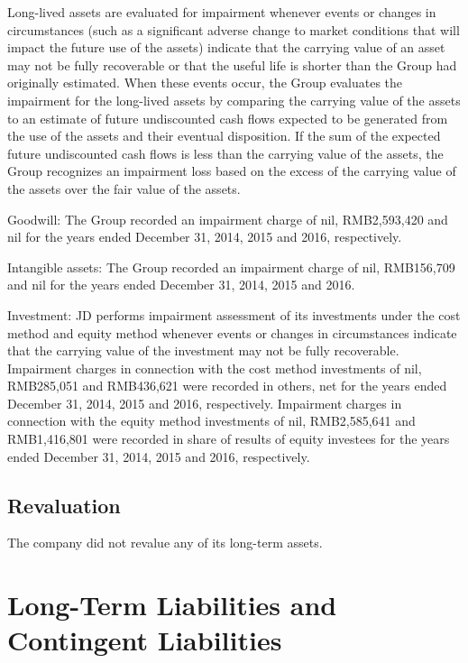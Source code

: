 Long-lived assets are evaluated for impairment whenever events or changes in circumstances (such as a significant adverse change to market conditions that will impact the future use of the assets) indicate that the carrying value of an asset may not be fully recoverable or that the useful life is shorter than the Group had originally estimated. When these events occur, the Group evaluates the impairment for the long-lived assets by comparing the carrying value of the assets to an estimate of future undiscounted cash flows expected to be generated from the use of the assets and their eventual disposition. If the sum of the expected future undiscounted cash flows is less than the carrying value of the assets, the Group recognizes an impairment loss based on the excess of the carrying value of the assets over the fair value of the assets.

Goodwill: The Group recorded an impairment charge of nil, RMB2,593,420 and nil for the years ended December 31, 2014, 2015 and 2016, respectively.

Intangible assets: The Group recorded an impairment charge of nil, RMB156,709 and nil for the years ended December 31, 2014, 2015 and 2016.

Investment: JD performs impairment assessment of its investments under the cost method and equity method whenever events or changes in circumstances indicate that the carrying value of the investment may not be fully recoverable. Impairment charges in connection with the cost method investments of nil, RMB285,051 and RMB436,621 were recorded in others, net for the years ended December 31, 2014, 2015 and 2016, respectively. Impairment charges in connection with the equity method investments of nil, RMB2,585,641 and RMB1,416,801 were recorded in share of results of equity investees for the years ended December 31, 2014, 2015 and 2016, respectively.

\subsection{Revaluation}
The company did not revalue any of its long-term assets.

\section{Long-Term Liabilities and Contingent Liabilities}

